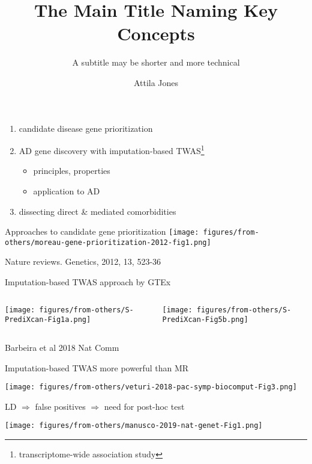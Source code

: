 \documentclass{beamer}
\title{The Main Title Naming Key Concepts}
\subtitle{A subtitle may be shorter and more technical}
\author{Attila Jones}
\date{}
\begin{document}
\begin{frame}
\begin{enumerate}
\item candidate disease gene prioritization
\item AD gene discovery with imputation-based TWAS\footnote{transcriptome-wide association study}
	\begin{itemize}
		\item principles, properties
		\item application to AD
	\end{itemize}
\item dissecting direct \& mediated comorbidities
\end{enumerate}
\end{frame}

\begin{frame}{Approaches to candidate gene prioritization}
\texttt{[image: figures/from-others/moreau-gene-prioritization-2012-fig1.png]}

\tiny{Nature reviews. Genetics, 2012, 13, 523-36}
\end{frame}

\begin{frame}{Imputation-based TWAS approach by GTEx}
\begin{columns}[t]
\begin{column}{0.5\textwidth}

\texttt{[image: figures/from-others/S-PrediXcan-Fig1a.png]}

\end{column}

\begin{column}{0.5\textwidth}

\texttt{[image: figures/from-others/S-PrediXcan-Fig5b.png]}
\end{column}
\end{columns}
\tiny{Barbeira et al 2018 Nat Comm}
\end{frame}

\begin{frame}{Imputation-based TWAS more powerful than MR}

\texttt{[image: figures/from-others/veturi-2018-pac-symp-biocomput-Fig3.png]}
\end{frame}

\begin{frame}{LD $\Rightarrow$ false positives $\Rightarrow$ need for post-hoc
	test}

\texttt{[image: figures/from-others/manusco-2019-nat-genet-Fig1.png]}
\end{frame}
\end{document}
